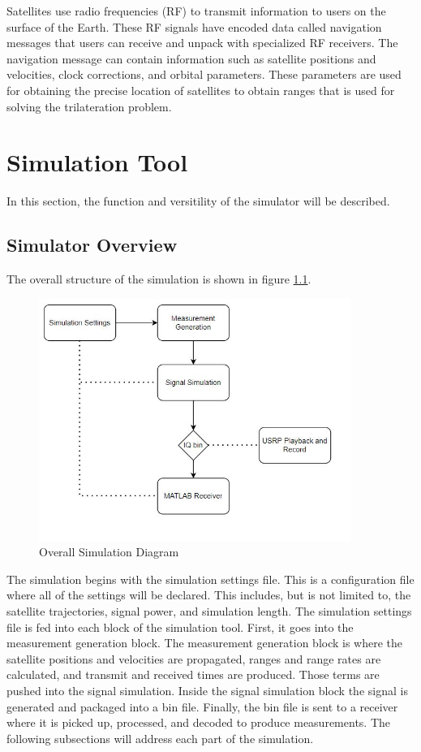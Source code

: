 \documentclass[12pt]{report}
\begin{document}
Satellites use radio frequencies (RF) to transmit information to users on the surface of the Earth. These RF signals have encoded data called navigation messages that users can receive and unpack with specialized RF receivers. The navigation message can contain information such as satellite positions and velocities, clock corrections, and orbital parameters. These parameters are used for obtaining the precise location of satellites to obtain ranges that is used for solving the trilateration problem.

\chapter {Simulation Tool}
In this section, the function and versitility of the simulator will be described.

\section{Simulator Overview}

The overall structure of the simulation is shown in figure \ref{fig:SimDiagram}.
\begin{figure}[ht]
    \centering
    \includegraphics[width=4.0in]{OverallSimulationDiagram}
    \caption{Overall Simulation Diagram}
    \label{fig:SimDiagram}
\end{figure}

The simulation begins with the simulation settings file. This is a configuration file where all of the settings will be declared. This includes, but is not limited to, the satellite trajectories, signal power, and simulation length. The simulation settings file is fed into each block of the simulation tool. First, it goes into the measurement generation block. The measurement generation block is where the satellite positions and velocities are propagated, ranges and range rates are calculated, and transmit and received times are produced. Those terms are pushed into the signal simulation. Inside the signal simulation block the signal is generated and packaged into a bin file. Finally, the bin file is sent to a receiver where it is picked up, processed, and decoded to produce measurements. The following subsections will address each part of the simulation.
\end{document}
